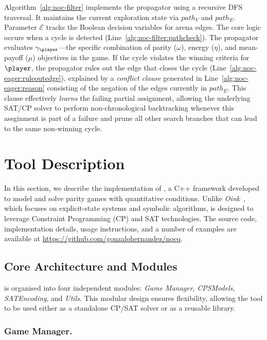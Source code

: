 \documentclass[a4paper,UKenglish,cleveref, autoref, thm-restate, anonymous]{lipics-v2021}
\begin{document}
Algorithm~\ref{alg:noc-filter} implements the \noc propagator using a recursive DFS traversal. It maintains the current exploration state via $path_V$ and $path_E$. Parameter $\mathcal{E}$ tracks the Boolean decision variables for arena edges. The core logic occurs when a cycle is detected (Line~\ref{alg:noc-filter:pathcheck}). The propagator evaluates $\gamma_{\player}$---the specific combination of parity ($\omega$), energy ($\eta$), and mean-payoff ($\mu$) objectives in the game. 
%
If the cycle violates the winning criteria for $\player$, the propagator rules out the edge that closes the cycle (Line~\ref{alg:noc-eager:ruleoutedge}), explained by a \textit{conflict clause} generated in Line~\ref{alg:noc-eager:reason} consisting of the negation of the edges currently in $path_E$. This clause effectively {\em learns} the failing partial assignment, allowing the underlying SAT/CP solver to perform non-chronological backtracking whenever this assginment is part of a failure and prune all other search branches that can lead to the same non-winning cycle.

\section{Tool Description}

In this section, we describe the implementation of \nocq, a C++ framework developed to model and solve parity games with quantitative conditions. Unlike \emph{Oink}~\cite{vanDijk:2018}, which focuses on explicit-state systems and symbolic algorithms, \nocq is designed to leverage Constraint Programming (CP) and SAT technologies. The source code, implementation details, usage instructions, and a number of examples are available at \url{https://github.com/gonzalohernandez/nocq}.

\subsection*{Core Architecture and Modules}

\nocq is organised into four independent modules: \emph{Game Manager}, \emph{CPSModels}, \emph{SATEncoding}, and \emph{Utils}. This modular design ensures flexibility, allowing the tool to be used either as a standalone CP/SAT solver or as a reusable library.


\subsubsection*{Game Manager.}
\end{document}
